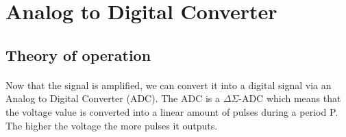 \documentclass{article}[12pt]
\begin{document}
\section{Analog to Digital Converter}
\subsection{Theory of operation}
\paragraph{}
Now that the signal is amplified, we can convert it into a digital signal via an Analog to Digital Converter (ADC).
The ADC is a $\Delta$$\Sigma$-ADC which means that the voltage value is converted into a linear amount of pulses during a period P. 
The higher the voltage the more pulses it outputs.
\end{document}
